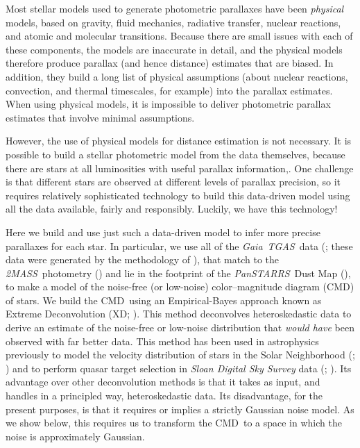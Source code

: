 \documentclass[modern]{aastex61}
\newcommand{\acronym}[1]{{\small{#1}}}
\newcommand{\project}[1]{\textsl{#1}}
\newcommand{\tgas}{\project{\acronym{TGAS}}}
\newcommand{\tmass}{\project{\acronym{2MASS}}}
\newcommand{\gaia}{\project{Gaia}}
\newcommand{\panstarrs}{\project{Pan\acronym{STARRS}}}
\newcommand{\cmd}{\acronym{CMD}}
\begin{document}
Most stellar models used to generate photometric
parallaxes have been \emph{physical} models, based on gravity, fluid mechanics,
radiative transfer, nuclear reactions, and atomic and molecular transitions.
Because there are small issues with each of these components, the models are inaccurate in detail, and
the physical models therefore produce parallax (and hence distance) estimates that are biased.
In addition, they build a long list of physical assumptions (about
nuclear reactions, convection, and thermal timescales, for example)
into the parallax estimates.
When using physical models, it is impossible to deliver photometric parallax estimates that involve minimal assumptions.

However, the use of physical models for distance estimation is not necessary.
It is possible to build a stellar photometric model from the data themselves,
because there are stars at all luminosities with useful parallax information,.
One challenge is that different stars are observed at different levels of parallax precision,
so it requires relatively sophisticated technology to build this data-driven model
using all the data available, fairly and responsibly.
Luckily, we have this technology!

Here we build and use just such a data-driven model to infer more precise parallaxes for each star.
In particular, we use all of the \gaia\ \tgas\ data (\citealt{tgas};
these data were generated by the methodology of \citealt{michalik15}), that match to the
\tmass\ photometry (\citealt{skrutskie06}) and lie in the footprint of
the \panstarrs\ Dust Map (\citealt{green15}), to make a model of the
noise-free (or low-noise) color--magnitude diagram (\cmd) of stars.
We build the \cmd\ using an Empirical-Bayes approach known as Extreme Deconvolution (XD;
\citealt{bovy11}).
This method deconvolves heteroskedastic data to derive an
estimate of the noise-free or low-noise distribution that \emph{would
  have} been observed with far better data.
This method has been used in astrophysics
previously to model the velocity distribution of stars in the Solar
Neighborhood (\citealt{hogg05}; \citealt{bovy09}) and to
perform quasar target selection
in \project{Sloan Digital Sky Survey} data (\citealt{xdqso}; \citealt{xdqsoz}).
Its advantage over other deconvolution methods is that it takes as input,
and handles in a principled way, heteroskedastic data.
Its disadvantage, for the present purposes, is that it requires
or implies a strictly Gaussian noise model.
As we show below, this requires us to transform the \cmd\ to a space in which
the noise is approximately Gaussian.
\end{document}
